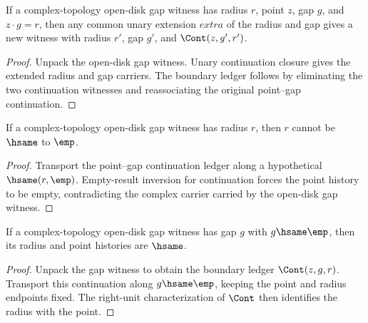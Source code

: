 \begin{theorem}
\label{thm:cplx-topo-open-disk-gap-radius-extension}
If a complex-topology open-disk gap witness has radius \(r\), point \(z\),
gap \(g\), and \(z\cdot g=r\), then any common unary extension \(extra\) of
the radius and gap gives a new witness with radius \(r'\), gap \(g'\), and
\(\Cont(z,g',r')\).
\end{theorem}
\begin{proof}
Unpack the open-disk gap witness. Unary continuation closure gives the
extended radius and gap carriers. The boundary ledger follows by eliminating
the two continuation witnesses and reassociating the original point--gap
continuation.
\end{proof}

\begin{theorem}
\label{thm:cplx-topo-open-disk-gap-radius-not-empty}
If a complex-topology open-disk gap witness has radius \(r\), then
\(r\) cannot be \(\hsame\) to \(\emp\).
\end{theorem}
\begin{proof}
Transport the point--gap continuation ledger along a hypothetical
\(\hsame(r,\emp)\). Empty-result inversion for continuation forces the point
history to be empty, contradicting the complex carrier carried by the open-disk
gap witness.
\end{proof}

\begin{theorem}
\label{thm:cplx-topo-open-disk-gap-empty-gap-radius-point}
If a complex-topology open-disk gap witness has gap \(g\) with
\(g\hsame\emp\), then its radius and point histories are \(\hsame\).
\end{theorem}
\begin{proof}
Unpack the gap witness to obtain the boundary ledger \(\Cont(z,g,r)\).
Transport this continuation along \(g\hsame\emp\), keeping the point and radius
endpoints fixed. The right-unit characterization of \(\Cont\) then identifies
the radius with the point.
\end{proof}

